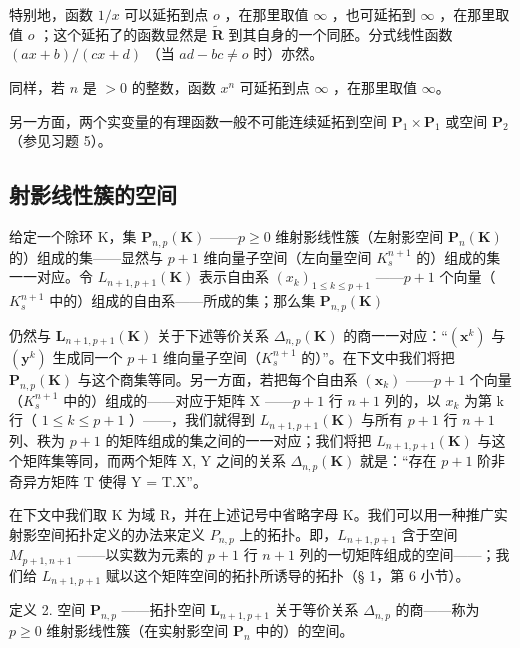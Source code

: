 特别地，函数 \(1 / x\) 可以延拓到点 \(o\) ，在那里取值 \(\infty\) ，也可延拓到 \(\infty\) ，在那里取值 \(o\) ；这个延拓了的函数显然是 \(\tilde{\mathbf{R}}\) 到其自身的一个同胚。分式线性函数 \((ax + b) / (cx + d)\) （当 \(ad - bc \neq o\) 时）亦然。

同样，若 \(n\) 是 \(> 0\) 的整数，函数 \(x^n\) 可延拓到点 \(\infty\) ，在那里取值 \(\infty\)。

另一方面，两个实变量的有理函数一般不可能连续延拓到空间 \(\mathbf{P}_1 \times \mathbf{P}_1\) 或空间 \(\mathbf{P}_2\)（参见习题 5）。

\subsection{射影线性簇的空间}

给定一个除环 K，集 \(\mathbf{P}_{n,p}(\mathbf{K})\) ——\(p \geqslant 0\) 维射影线性簇（左射影空间 \(\mathbf{P}_{n}(\mathbf{K})\) 的）组成的集——显然与 \(p + 1\) 维向量子空间（左向量空间 \(K_{s}^{n+1}\) 的）组成的集一一对应。令 \(L_{n+1, p+1}(\mathbf{K})\) 表示自由系 \((x_{k})_{1 \leqslant k \leqslant p+1}\) ——\(p + 1\) 个向量（\(K_{s}^{n+1}\) 中的）组成的自由系——所成的集；那么集 \(\mathbf{P}_{n,p}(\mathbf{K})\)

仍然与 \(\mathbf{L}_{n+1,p+1}(\mathbf{K})\) 关于下述等价关系 \(\Delta_{n,p}(\mathbf{K})\) 的商一一对应：“\((\mathbf{x}^{k})\) 与 \((\mathbf{y}^{k})\) 生成同一个 \(p+1\) 维向量子空间（\(K_{s}^{n+1}\) 的）”。在下文中我们将把 \(\mathbf{P}_{n,p}(\mathbf{K})\) 与这个商集等同。另一方面，若把每个自由系 \((\mathbf{x}_{k})\) ——\(p+1\) 个向量（\(K_{s}^{n+1}\) 中的）组成的——对应于矩阵 X ——\(p+1\) 行 \(n+1\) 列的，以 \(x_{k}\) 为第 k 行（ \(1\leqslant k\leqslant p+1\) ）——，我们就得到 \(L_{n+1,p+1}(\mathbf{K})\) 与所有 \(p+1\) 行 \(n+1\) 列、秩为 \(p+1\) 的矩阵组成的集之间的一一对应；我们将把 \(L_{n+1,p+1}(\mathbf{K})\) 与这个矩阵集等同，而两个矩阵 X, Y 之间的关系 \(\Delta_{n,p}(\mathbf{K})\) 就是：“存在 \(p+1\) 阶非奇异方矩阵 T 使得 Y = T.X”。

在下文中我们取 K 为域 R，并在上述记号中省略字母 K。我们可以用一种推广实射影空间拓扑定义的办法来定义 \(P_{n,p}\) 上的拓扑。即，\(L_{n+1, p+1}\) 含于空间 \(M_{p+1, n+1}\) ——以实数为元素的 \(p + 1\) 行 \(n + 1\) 列的一切矩阵组成的空间——；我们给 \(L_{n+1, p+1}\) 赋以这个矩阵空间的拓扑所诱导的拓扑（§ 1，第 6 小节）。

定义 2. 空间 \(\mathbf{P}_{n,p}\) ——拓扑空间 \(\mathbf{L}_{n+1,p+1}\) 关于等价关系 \(\Delta_{n,p}\) 的商——称为 \(p\geqslant0\) 维射影线性簇（在实射影空间 \(\mathbf{P}_{n}\) 中的）的空间。

